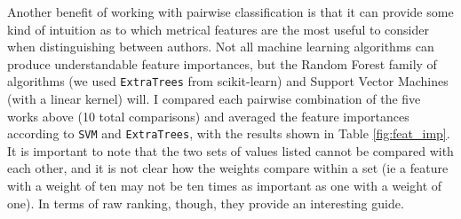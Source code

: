\documentclass[11pt,a4paper]{scrartcl} %
\begin{document}
{Another benefit of working with pairwise classification is that it can provide some kind of intuition as to which metrical features are the most useful to consider when distinguishing between authors. Not all machine learning algorithms can produce understandable feature importances, but the Random Forest family of algorithms (we used \texttt{ExtraTrees} from scikit-learn) and Support Vector Machines (with a linear kernel) will. I compared each pairwise combination of the five works above (10 total comparisons) and averaged the feature importances according to \texttt{SVM} and \texttt{ExtraTrees}, with the results shown in Table \ref{fig:feat_imp}. It is important to note that the two sets of values listed cannot be compared with each other, and it is not clear how the weights compare within a set (ie a feature with a weight of ten may not be ten times as important as one with a weight of one). In terms of raw ranking, though, they provide an interesting guide. 
\begin{table}
\caption{Ranked Feature Importances, as determined by \texttt{ExtraTrees} and \texttt{SVM}}
\label{fig:feat_imp}
\phantom{x}
\centering
{}
\end{table}
}
\end{document}
